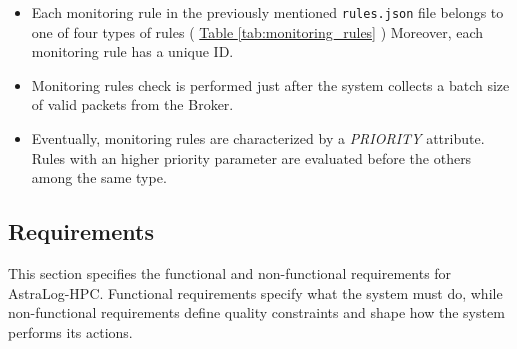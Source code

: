 \documentclass{article}
\newcommand{\tablerefer}[1]{%
    \hyperref[#1_top]{Table \ref*{#1}}%
}
\begin{document}
\begin{itemize}
    \item Each monitoring rule in the previously mentioned \verb|rules.json| file belongs to one of four types of rules (\tablerefer{tab:monitoring_rules}) Moreover, each monitoring rule has a unique ID. 
    \item Monitoring rules check is performed just after the system collects a batch size of valid packets from the Broker.
    \item Eventually, monitoring rules are characterized by a \textit{PRIORITY} attribute. Rules with an higher priority parameter are evaluated before the others among the same type. %
\end{itemize}

\subsection{Requirements}
This section specifies the functional and non-functional requirements for AstraLog-HPC. Functional requirements specify what the system must do, while non-functional requirements define quality constraints and shape how the system performs its actions.
\end{document}
